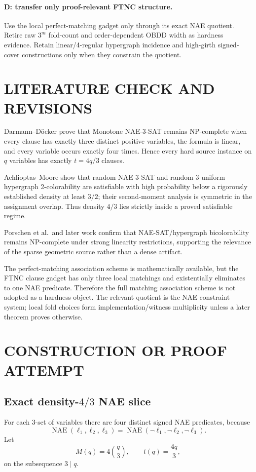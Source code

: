 \documentclass[11pt]{article}
\begin{document}
\paragraph{D: transfer only proof-relevant FTNC structure.}
Use the local perfect-matching gadget only through its exact NAE quotient. Retire raw $3^m$ fold-count and order-dependent OBDD width as hardness evidence. Retain linear/4-regular hypergraph incidence and high-girth signed-cover constructions only when they constrain the quotient.

\section{LITERATURE CHECK AND REVISIONS}
Darmann--D\"ocker prove that Monotone NAE-3-SAT remains NP-complete when every clause has exactly three distinct positive variables, the formula is linear, and every variable occurs exactly four times. Hence every hard source instance on $q$ variables has exactly $t=4q/3$ clauses.

Achlioptas--Moore show that random NAE-3-SAT and random 3-uniform hypergraph 2-colorability are satisfiable with high probability below a rigorously established density at least $3/2$; their second-moment analysis is symmetric in the assignment overlap. Thus density $4/3$ lies strictly inside a proved satisfiable regime.

Porschen et al.\ and later work confirm that NAE-SAT/hypergraph bicolorability remains NP-complete under strong linearity restrictions, supporting the relevance of the sparse geometric source rather than a dense artifact.

The perfect-matching association scheme is mathematically available, but the FTNC clause gadget has only three local matchings and existentially eliminates to one NAE predicate. Therefore the full matching association scheme is not adopted as a hardness object. The relevant quotient is the NAE constraint system; local fold choices form implementation/witness multiplicity unless a later theorem proves otherwise.

\section{CONSTRUCTION OR PROOF ATTEMPT}

\subsection{Exact density-$4/3$ NAE slice}
For each 3-set of variables there are four distinct signed NAE predicates, because
\[
\operatorname{NAE}(\ell_1,\ell_2,\ell_3)
=
\operatorname{NAE}(\neg\ell_1,\neg\ell_2,\neg\ell_3).
\]
Let
\[
M(q)=4\binom q3,\qquad t(q)=\frac{4q}{3},
\]
on the subsequence $3\mid q$.
\end{document}
